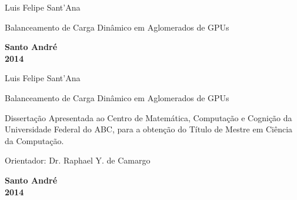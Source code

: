 \begin{titlepage}

\begin{center}
{\LARGE Luis Felipe Sant'Ana}
\par
\vspace{200pt}
{\Huge  Balanceamento de Carga Dinâmico em Aglomerados de GPUs }
\par
\vfill
\textbf{{\large Santo André}\\
{\large 2014}}
\end{center}
\end{titlepage}

\pagestyle{empty}
\cleardoublepage


\begin{center}
{\LARGE Luis Felipe Sant'Ana}
\par
\vspace{200pt}
{\Huge  Balanceamento de Carga Dinâmico em Aglomerados de GPUs}
\end{center}
\par
\vspace{90pt}
\hspace*{175pt}\parbox{7.8cm}{{\large Dissertação Apresentada ao Centro de Matemática, Computação e 
Cognição da Universidade Federal do ABC, para a obtenção do Título de Mestre em Ciência da Computação.}}

\par
\vspace{1em}
\hspace*{175pt}\parbox{7.6cm}{{\large Orientador: Dr. Raphael Y. de Camargo}}

\par
\vfill
\begin{center}
\textbf{{\large Santo André}\\
{\large 2014}}
\end{center}

\newpage

